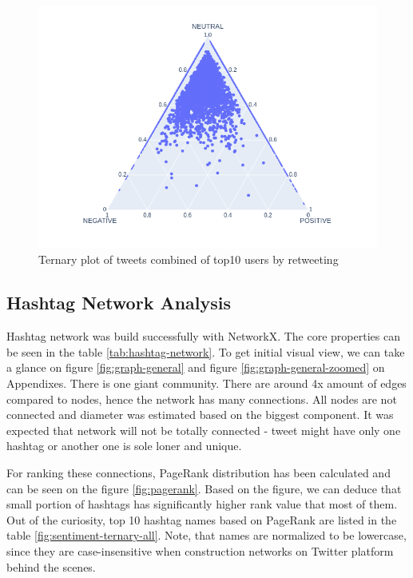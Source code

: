 \documentclass[conference]{IEEEtran}
\begin{document}
\begin{figure}
\includegraphics[scale=0.4]{figures/sentiment_ternary_all}
\caption{Ternary plot of tweets combined of top10 users by retweeting }
\label{fig:sentiment-ternary-user-retweet}
\end{figure}

\subsection{Hashtag Network Analysis}

Hashtag network was build successfully with NetworkX.
The core properties can be seen in the table \ref{tab:hashtag-network}.
To get initial visual view, we can take a glance on figure \ref{fig:graph-general} and figure \ref{fig:graph-general-zoomed} on Appendixes.
There is one giant community.
There are around 4x amount of edges compared to nodes, hence the network has many connections.
All nodes are not connected and diameter was estimated based on the biggest component.
It was expected that network will not be totally connected - tweet might have only one hashtag or another one is sole loner and unique.

For ranking these connections, PageRank distribution has been calculated and can be seen on the figure \ref{fig:pagerank}.
Based on the figure, we can deduce that small portion of hashtags has significantly higher rank value that most of them.
Out of the curiosity, top 10 hashtag names based on PageRank are listed in the table \ref{fig:sentiment-ternary-all}.
Note, that names are normalized to be lowercase, since they are case-insensitive when construction networks on Twitter platform behind the scenes.
\end{document}
